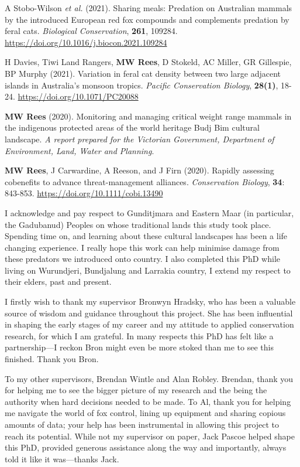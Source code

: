 \documentclass[11pt,a4paper,titlepage,twoside,openright]{style/unimelbthesis}
\begin{document}
\begin{frontmatter}
\begin{preface}
    A Stobo-Wilson \emph{et al.} (2021). Sharing meals: Predation on Australian mammals by the introduced European red fox compounds and complements predation by feral cats. \emph{Biological Conservation}, \textbf{261}, 109284. \url{https://doi.org/10.1016/j.biocon.2021.109284}

    H Davies, Tiwi Land Rangers, \textbf{MW Rees}, D Stokeld, AC Miller, GR Gillespie, BP Murphy (2021). Variation in feral cat density between two large adjacent islands in Australia's monsoon tropics. \emph{Pacific Conservation Biology}, \textbf{28(1)}, 18-24. \url{https://doi.org/10.1071/PC20088}

    \textbf{MW Rees} (2020). Monitoring and managing critical weight range mammals in the indigenous protected areas of the world heritage Budj Bim cultural landscape. \emph{A report prepared for the Victorian Government, Department of Environment, Land, Water and Planning}.

    \textbf{MW Rees}, J Carwardine, A Reeson, and J Firn (2020). Rapidly assessing cobenefits to advance threat-management alliances. \emph{Conservation Biology}, \textbf{34}: 843-853. \url{https://doi.org/10.1111/cobi.13490}
  \end{preface}
  \begin{acknowledgements}
    I acknowledge and pay respect to Gunditjmara and Eastern Maar (in particular, the Gadubanud) Peoples on whose traditional lands this study took place. Spending time on, and learning about these cultural landscapes has been a life changing experience. I really hope this work can help minimise damage from these predators we introduced onto country. I also completed this PhD while living on Wurundjeri, Bundjalung and Larrakia country, I extend my respect to their elders, past and present.

    I firstly wish to thank my supervisor Bronwyn Hradsky, who has been a valuable source of wisdom and guidance throughout this project. She has been influential in shaping the early stages of my career and my attitude to applied conservation research, for which I am grateful. In many respects this PhD has felt like a partnership---I reckon Bron might even be more stoked than me to see this finished. Thank you Bron.

    To my other supervisors, Brendan Wintle and Alan Robley. Brendan, thank you for helping me to see the bigger picture of my research and the being the authority when hard decisions needed to be made. To Al, thank you for helping me navigate the world of fox control, lining up equipment and sharing copious amounts of data; your help has been instrumental in allowing this project to reach its potential. While not my supervisor on paper, Jack Pascoe helped shape this PhD, provided generous assistance along the way and importantly, always told it like it was---thanks Jack.


\end{acknowledgements}
\end{frontmatter}
\end{document}
